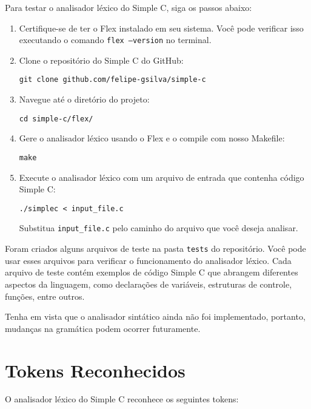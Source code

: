 \documentclass[12pt,a4paper]{article}
\begin{document}
Para testar o analisador léxico do Simple C, siga os passos abaixo:
\begin{enumerate}
  \item Certifique-se de ter o Flex instalado em seu sistema. Você pode verificar isso executando o comando \texttt{flex --version} no terminal.
  \item Clone o repositório do Simple C do GitHub:
 \begin{verbatim}
git clone github.com/felipe-gsilva/simple-c
 \end{verbatim}
  \item Navegue até o diretório do projeto:
 \begin{verbatim}
cd simple-c/flex/
 \end{verbatim}
  \item Gere o analisador léxico usando o Flex e o compile com nosso Makefile:
 \begin{verbatim}
make
 \end{verbatim}
  \item Execute o analisador léxico com um arquivo de entrada que contenha código Simple C:
 \begin{verbatim}
./simplec < input_file.c
 \end{verbatim}
 Substitua \texttt{input\_file.c} pelo caminho do arquivo que você deseja analisar.

\end{enumerate}

Foram criados alguns arquivos de teste na pasta \texttt{tests} do repositório. Você pode usar esses arquivos para verificar o funcionamento do analisador léxico. Cada arquivo de teste contém exemplos de código Simple C que abrangem diferentes aspectos da linguagem, como declarações de variáveis, estruturas de controle, funções, entre outros. 

Tenha em vista que o analisador sintático ainda não foi implementado, portanto, mudanças na gramática podem ocorrer futuramente.

\newpage
\section{Tokens Reconhecidos}
\label{sec:token}

O analisador léxico do Simple C reconhece os seguintes tokens:
\end{document}
